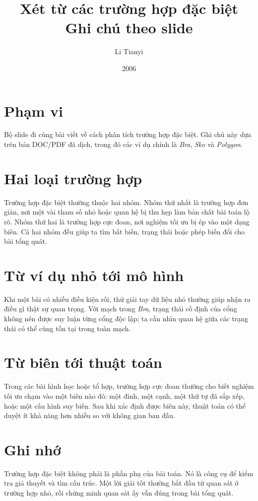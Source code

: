 \documentclass[11pt]{article}
\title{Xét từ các trường hợp đặc biệt\\{\large Ghi chú theo slide}}
\author{Li Tianyi}
\date{2006}
\begin{document}
\maketitle


\section{Phạm vi}

Bộ slide đi cùng bài viết về cách phân tích trường hợp đặc biệt. Ghi chú này
dựa trên bản DOC/PDF đã dịch, trong đó các ví dụ chính là \emph{Bra},
\emph{Sko} và \emph{Polygon}.

\section{Hai loại trường hợp}

Trường hợp đặc biệt thường thuộc hai nhóm. Nhóm thứ nhất là trường hợp đơn
giản, nơi một vài tham số nhỏ hoặc quan hệ bị thu hẹp làm bản chất bài toán
lộ rõ. Nhóm thứ hai là trường hợp cực đoan, nơi nghiệm tối ưu bị ép vào một
dạng biên. Cả hai nhóm đều giúp ta tìm bất biến, trạng thái hoặc phép biến
đổi cho bài tổng quát.

\section{Từ ví dụ nhỏ tới mô hình}

Khi một bài có nhiều điều kiện rối, thử giải tay dữ liệu nhỏ thường giúp nhận
ra điều gì thật sự quan trọng. Với mạch trong \emph{Bra}, trạng thái cố định
của cổng không nên được suy luận từng cổng độc lập; ta cần nhìn quan hệ giữa
các trạng thái có thể cùng tồn tại trong toàn mạch.

\section{Từ biên tới thuật toán}

Trong các bài hình học hoặc tổ hợp, trường hợp cực đoan thường cho biết nghiệm
tối ưu chạm vào một biên nào đó: một đỉnh, một cạnh, một thứ tự đã sắp xếp,
hoặc một cấu hình suy biến. Sau khi xác định được biên này, thuật toán có thể
duyệt ít khả năng hơn nhiều so với không gian ban đầu.

\section{Ghi nhớ}

Trường hợp đặc biệt không phải là phần phụ của bài toán. Nó là công cụ để kiểm
tra giả thuyết và tìm cấu trúc. Một lời giải tốt thường bắt đầu từ quan sát ở
trường hợp nhỏ, rồi chứng minh quan sát ấy vẫn đúng trong bài tổng quát.
\end{document}
